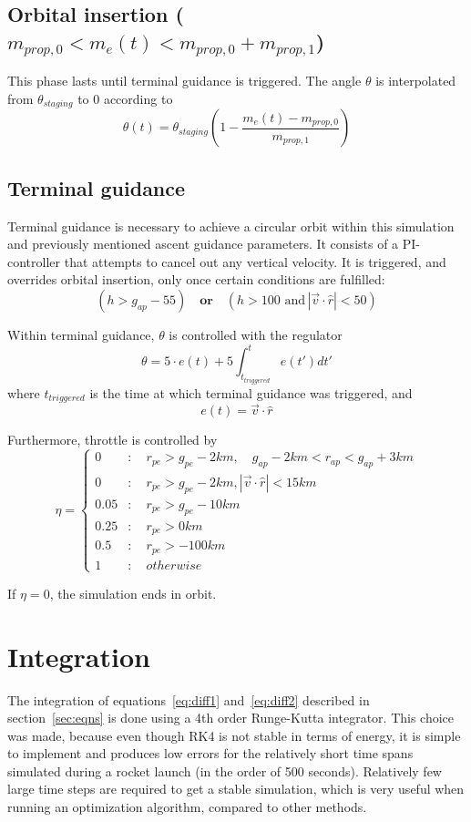 \documentclass[11pt]{article}
\begin{document}
\subsection{Orbital insertion ($m_{prop,0} < m_e(t) < m_{prop,0} + m_{prop,1}$)}
This phase lasts until terminal guidance is triggered. The angle $\theta$ is interpolated from $\theta_{staging}$ to 0 according to
$$
\theta(t) = \theta_{staging} \left( 1 - \frac{m_e(t) - m_{prop,0}}{m_{prop,1}} \right)
$$

\subsection{Terminal guidance}
Terminal guidance is necessary to achieve a circular orbit within this simulation and previously mentioned ascent guidance parameters.
It consists of a PI-controller that attempts to cancel out any vertical velocity.
It is triggered, and overrides orbital insertion, only once certain conditions are fulfilled:
$$
\left( h > g_{ap} - 55  \right) \quad \textbf{or} \quad \left(  h > 100 \,\, \text{and} \, \left| \vec{v} \cdot \hat{r} \right| < 50 \right)
$$

Within terminal guidance, $\theta$ is controlled with the regulator 
$$
\theta = 5 \cdot e(t) + 5 \int_{t_{triggered}}^t e(t') dt'
$$
where $t_{triggered}$ is the time at which terminal guidance was triggered, and
$$
e(t) = \vec{v} \cdot \hat{r}
$$

Furthermore, throttle is controlled by
$$
\eta = \begin{cases}
0 & : \quad r_{pe} > g_{pe} - 2 km, \quad g_{ap} - 2 km < r_{ap} < g_{ap} + 3 km \\
0 & : \quad r_{pe} > g_{pe} - 2 km, \left| \vec{v} \cdot \hat{r} \right| < 15 km \\
0.05 & : \quad r_{pe} > g_{pe} - 10 km \\
0.25 & : \quad r_{pe} > 0 km \\
0.5 & : \quad r_{pe} > -100 km \\
1 & :  \quad otherwise
\end{cases}
$$

If $\eta = 0$, the simulation ends in orbit.

\section{Integration}
The integration of equations~\eqref{eq:diff1} and~\eqref{eq:diff2} described in section~\ref{sec:eqns} is done using a 4th order Runge-Kutta integrator.
This choice was made, because even though RK4 is not stable in terms of energy, it is simple to implement and produces low errors for the relatively short time spans 
simulated during a rocket launch (in the order of 500 seconds).
Relatively few large time steps are required to get a stable simulation, which is very useful when running an optimization algorithm, compared to other methods.
\end{document}
